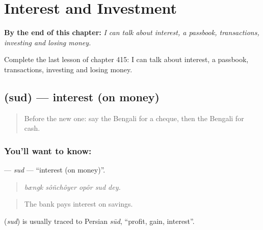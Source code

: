 
\chapter{Interest and Investment}
\label{ch:bn-interest-and-investment}

\begin{chapteropening}
\textbf{By the end of this chapter:} \emph{I can talk about interest, a passbook, transactions, investing and losing money.}

Complete the last lesson of chapter 415: I can talk about interest, a passbook, transactions, investing and losing money.
\end{chapteropening}

\section[\texorpdfstring{\bn{সুদ} (sud)}{সুদ (sud)}]{ (sud) — interest (on money)}

\label{lesson:BN-C415-sud}



\begin{quote}
Before the new one: say the Bengali for a cheque, then the Bengali for cash.
\end{quote}

\subsection*{You'll want to know: }
\textbf{} — \emph{sud} — \textquotedblleft{}interest (on money)\textquotedblright{}.

\begin{quote}
    
\end{quote}

\begin{quote}
\emph{bængk sôñchôyer opôr sud dey.}
\end{quote}

\begin{quote}
The bank pays interest on savings.
\end{quote}

\begin{cousinweb}
\textbf{} (\emph{sud}) is usually traced to Persian \emph{sūd}, \textquotedblleft{}profit, gain, interest\textquotedblright{}.
\end{cousinweb}


